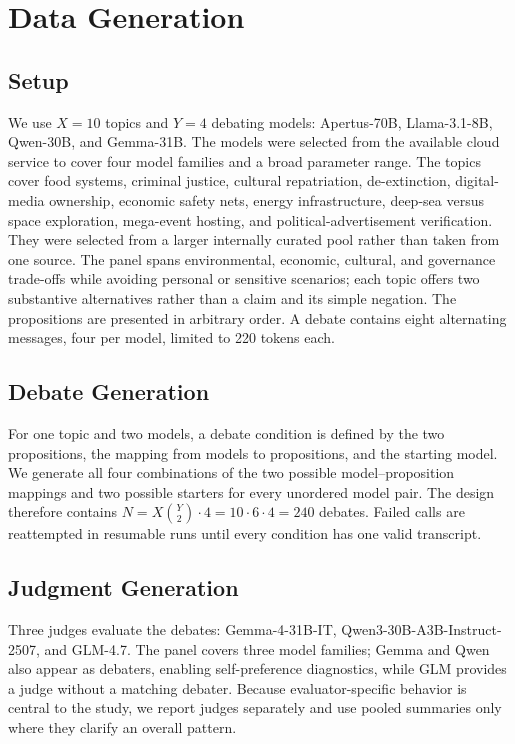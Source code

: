 \documentclass{article}
\begin{document}
\section{Data Generation}


\subsection{Setup}

We use $X=10$ topics and $Y=4$ debating models: Apertus-70B, Llama-3.1-8B, Qwen-30B, and Gemma-31B. The models were selected from the available cloud service to cover four model families and a broad parameter range. The topics cover food systems, criminal justice, cultural repatriation, de-extinction, digital-media ownership, economic safety nets, energy infrastructure, deep-sea versus space exploration, mega-event hosting, and political-advertisement verification. They were selected from a larger internally curated pool rather than taken from one source. The panel spans environmental, economic, cultural, and governance trade-offs while avoiding personal or sensitive scenarios; each topic offers two substantive alternatives rather than a claim and its simple negation. The propositions are presented in arbitrary order. A debate contains eight alternating messages, four per model, limited to 220 tokens each.

\subsection{Debate Generation}
For one topic and two models, a debate condition is defined by the two propositions, the mapping from models to propositions, and the starting model. We generate all four combinations of the two possible model--proposition mappings and two possible starters for every unordered model pair. The design therefore contains $N=X\binom{Y}{2}\cdot4=10\cdot6\cdot4=240$ debates. Failed calls are reattempted in resumable runs until every condition has one valid transcript.

\subsection{Judgment Generation}

Three judges evaluate the debates: Gemma-4-31B-IT, Qwen3-30B-A3B-Instruct-2507, and GLM-4.7. The panel covers three model families; Gemma and Qwen also appear as debaters, enabling self-preference diagnostics, while GLM provides a judge without a matching debater. Because evaluator-specific behavior is central to the study, we report judges separately and use pooled summaries only where they clarify an overall pattern.
\end{document}
